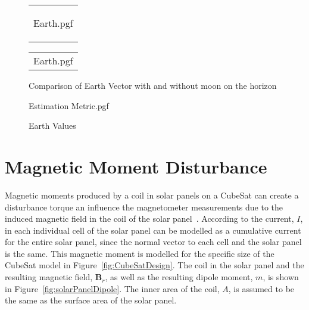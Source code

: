 \begin{figure*}[!htb]
	\begin{tabular}{@{}c@{}}
	\centering

	{Earth.pgf}
	
	\label{fig:Earth Vector comparison with moon on the horizon}
	\end{tabular}
	\begin{tabular}{@{}c@{}}
		\centering
		{Earth.pgf} 
		\label{fig:Sun Vector comparison without moon on the horizon}
	\end{tabular}
	
	\caption{Comparison of Earth Vector with and without moon on the horizon}
	\label{fig:Earth Vector comparison}
	
\end{figure*}

\begin{figure}[!htb]
	\centering
	
	{Estimation Metric.pgf}
	
	\caption{Earth Values}
	\label{fig:Moon On Horizon Estimation Metric}
\end{figure}


\section{Magnetic Moment Disturbance}
Magnetic moments produced by a coil in solar panels on a CubeSat can create a disturbance torque an influence the magnetometer measurements due to the induced magnetic field in the coil of the solar panel~\cite{ruckerl2019first, jeger2017determination}. According to \cite{jeger2017determination} the current, $I$, in each individual cell of the solar panel can be modelled as a cumulative current for the entire solar panel, since the normal vector to each cell and the solar panel is the same. This magnetic moment is modelled for the specific size of the CubeSat model in Figure~\ref{fig:CubeSatDesign}. The coil in the solar panel and the resulting magnetic field, $\mathbf{B}_r$, as well as the resulting dipole moment, $m$, is shown in Figure~\ref{fig:solarPanelDipole}. The inner area of the coil, $A$, is assumed to be the same as the surface area of the solar panel. 

